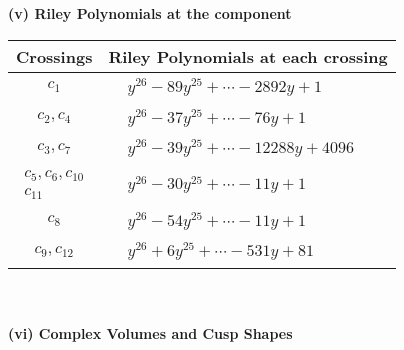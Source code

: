 \documentclass[1p]{elsarticle_modified}
\theoremstyle{definition}
\begin{document}
\newpage\renewcommand{\arraystretch}{1}
\flushleft \textbf{(v) Riley Polynomials at the component}\newline \\
\begin{tabular}{m{50pt}|m{274pt}}
Crossings & \hspace{64pt}Riley Polynomials at each crossing \\
\hline $$\begin{aligned}c_{1}\end{aligned}$$&$\begin{aligned}
&y^{26}-89 y^{25}+\cdots-2892 y+1
\end{aligned}$\\
\hline $$\begin{aligned}c_{2},c_{4}\end{aligned}$$&$\begin{aligned}
&y^{26}-37 y^{25}+\cdots-76 y+1
\end{aligned}$\\
\hline $$\begin{aligned}c_{3},c_{7}\end{aligned}$$&$\begin{aligned}
&y^{26}-39 y^{25}+\cdots-12288 y+4096
\end{aligned}$\\
\hline $$\begin{aligned}c_{5},c_{6},c_{10}\\c_{11}\end{aligned}$$&$\begin{aligned}
&y^{26}-30 y^{25}+\cdots-11 y+1
\end{aligned}$\\
\hline $$\begin{aligned}c_{8}\end{aligned}$$&$\begin{aligned}
&y^{26}-54 y^{25}+\cdots-11 y+1
\end{aligned}$\\
\hline $$\begin{aligned}c_{9},c_{12}\end{aligned}$$&$\begin{aligned}
&y^{26}+6 y^{25}+\cdots-531 y+81
\end{aligned}$\\
\hline
\end{tabular}\\~\\
\newpage\flushleft \textbf{(vi) Complex Volumes and Cusp Shapes}
\end{document}
